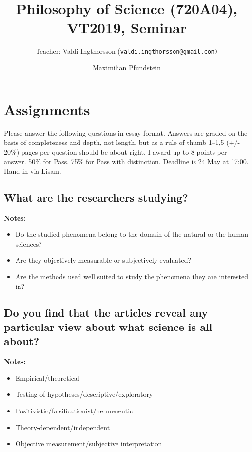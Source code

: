 \documentclass[11pt]{scrartcl}
\title{Philosophy of Science (720A04), VT2019, Seminar}
\subtitle{Teacher: Valdi Ingthorsson (\texttt{valdi.ingthorsson@gmail.com)}}
\author{Maximilian Pfundstein}
\begin{document}
\maketitle

\tableofcontents

\newpage

\section{Assignments}

Please answer the following questions in essay format. Answers are graded on the basis of completeness and depth, not length, but as a rule of thumb 1–1,5 (+/- 20\%) pages per question should be about right. I award up to 8 points per answer. 50\% for Pass, 75\% for Pass with distinction. Deadline is 24 May at 17:00. Hand-in via Lisam.

\subsection{What are the researchers studying?}

\textbf{Notes:}
\begin{itemize}
  \item Do the studied phenomena belong to the domain of the natural or the human sciences?
  \item Are they objectively measurable or subjectively evaluated?
  \item Are the methods used well suited to study the phenomena they are interested in?
\end{itemize}

\bigbreak

\subsection{Do you find that the articles reveal any particular view about what science is all about?}

\textbf{Notes:}
\begin{itemize}
  \item Empirical/theoretical
  \item Testing of hypotheses/descriptive/exploratory
  \item Positivistic/falsificationist/hermeneutic
  \item Theory-dependent/independent
  \item Objective measurement/subjective interpretation
\end{itemize}
\end{document}
